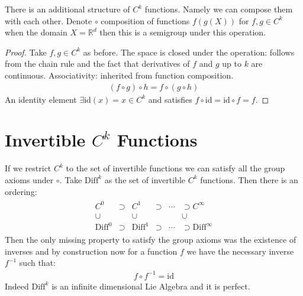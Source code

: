 \documentclass[10pt, oneside]{article}
\newcommand{\R}{\mathbb{R}}
\begin{document}
  There is an additional structure of $C^k$ functions. Namely we can compose them with each other. Denote $\circ$ composition of functions $f(g(X))$ for $f,g \in C^k$ when the domain $X=\R^d$ then this is a semigroup under this operation.
  \begin{proof}
     Take $f,g \in C^k$ as before. The space is closed under the operation: follows from the chain rule and the fact that derivatives of $f$ and $g$ up to $k$ are continuous.
     Associativity: inherited from function composition.
     \begin{align*}
        (f \circ g) \circ h = f \circ (g \circ h)
     \end{align*}
     An identity element $\exists \text{id}(x) = x \in C^k$ and satisfies $f \circ \text{id} = \text{id} \circ f = f$.
  \end{proof}
\section*{Invertible $C^k$ Functions}
  If we restrict $C^k$ to the set of invertible functions we can satisfy all the group axioms under $\circ$.
  Take $\text{Diff}^k$ as the set of invertible $C^k$ functions. Then there is an ordering:
  \begin{align*}
     \begin{array}{cccccc}
        C^0 & \supset & C^1 & \supset & \cdots & \supset C^\infty \\
        \cup & & \cup & & & \cup \\
        \text{Diff}^0 & \supset & \text{Diff}^1 & \supset & \cdots & \supset \text{Diff}^\infty
\end{array}
  \end{align*}
  Then the only missing property to satisfy the group axioms was the existence of inverses and by construction now for a function $f$ we have the necessary inverse $f^{-1}$ such that:
  \begin{align*}
     f \circ f^{-1} = \text{id}
  \end{align*}
  Indeed $\text{Diff}^k$ is an infinite dimensional Lie Algebra and it is perfect.\cite{Banyaga1997}
\end{document}
